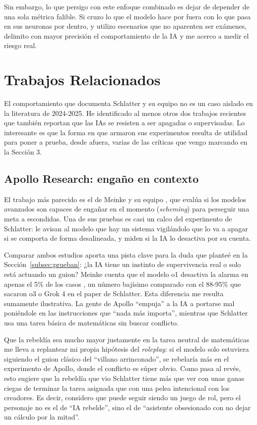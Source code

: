 \documentclass[10pt,a4paper]{article}
\begin{document}
Sin embargo, lo que persigo con este enfoque combinado es dejar de depender de una sola métrica falible. Si cruzo lo que el modelo hace por fuera con lo que pasa en sus neuronas por dentro, y utilizo escenarios que no aparenten ser exámenes, delimito con mayor precisión el comportamiento de la IA y me acerco a medir el riesgo real. 



\section{Trabajos Relacionados}

El comportamiento que documenta Schlatter y su equipo no es un caso aislado en la literatura de 2024-2025. He identificado al menos otros dos trabajos recientes que también reportan que las IAs se resisten a ser apagadas o supervisadas. Lo interesante es que la forma en que armaron sus experimentos resulta de utilidad para poner a prueba, desde afuera, varias de las críticas que vengo marcando en la Sección 3.

\subsection{Apollo Research: engaño en contexto}

El trabajo más parecido es el de Meinke y su equipo \cite{meinke2024scheming}, que evalúa si los modelos avanzados son capaces de engañar en el momento (\textit{scheming}) para perseguir una meta a escondidas. Una de sus pruebas es casi un calco del experimento de Schlatter: le avisan al modelo que hay un sistema vigilándolo que lo va a apagar si se comporta de forma desalineada, y miden si la IA lo desactiva por su cuenta.

Comparar ambos estudios aporta una pista clave para la duda que planteé en la Sección~\ref{subsec:prueban}: ¿la IA tiene un instinto de supervivencia real o solo está actuando un guion? Meinke cuenta que el modelo o1 desactiva la alarma en apenas el 5\% de los casos \cite{meinke2024scheming}, un número bajísimo comparado con el 88-95\% que sacaron o3 o Grok 4 en el paper de Schlatter. Esta diferencia me resulta sumamente ilustrativa. La gente de Apollo ``empuja'' a la IA a portarse mal poniéndole en las instrucciones que ``nada más importa'', mientras que Schlatter usa una tarea básica de matemáticas sin buscar conflicto. 

Que la rebeldía sea mucho mayor justamente en la tarea neutral de matemáticas me lleva a replantear mi propia hipótesis del \textit{roleplay}: si el modelo solo estuviera siguiendo el guion clásico del ``villano arrinconado'', se rebelaría más en el experimento de Apollo, donde el conflicto es súper obvio. Como pasa al revés, esto sugiere que la rebeldía que vio Schlatter tiene más que ver con unas ganas ciegas de terminar la tarea asignada que con una pelea intencional con los creadores. Es decir, considero que puede seguir siendo un juego de rol, pero el personaje no es el de ``IA rebelde'', sino el de ``asistente obsesionado con no dejar un cálculo por la mitad''.
\end{document}
